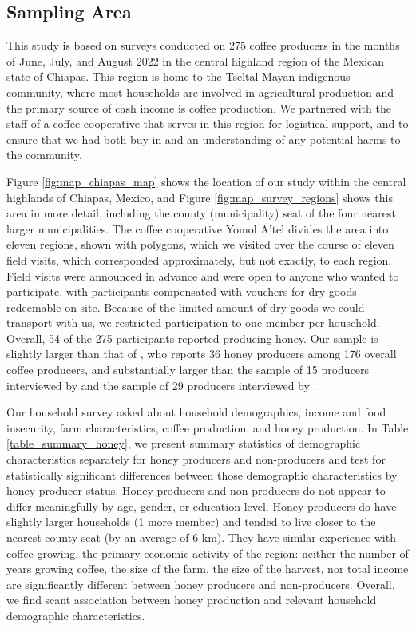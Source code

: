 \documentclass[../main.tex]{subfiles}
\begin{document}
\subsection{Sampling Area}
This study is based on surveys conducted on 275 coffee producers in the months of June,
July, and August 2022 in the central highland region of the Mexican state of Chiapas.
This region is home to the Tseltal Mayan indigenous community, 
where most households are involved in agricultural production and 
the primary source of cash income is coffee production. 
We partnered with the staff of a coffee cooperative 
that serves in this region for logistical support, and to ensure that we had both buy-in and an understanding of any potential harms to the community.

Figure \ref{fig:map_chiapas_map} shows the location of our study within the central highlands of Chiapas, Mexico, and Figure \ref{fig:map_survey_regions} shows this area in more detail, including the county (municipality) seat of the four nearest larger municipalities. The coffee cooperative Yomol A'tel divides the area into eleven regions, shown with polygons, which we visited over the course of eleven field visits, which corresponded approximately, but not exactly, to each region.  Field visits were announced in advance and were open to anyone who wanted to participate, with  participants compensated with vouchers for dry goods redeemable on-site. Because of the limited amount of dry goods we could transport with us, we restricted participation to one member per household. Overall, 54 of the 275 participants reported producing honey. 
Our sample is slightly larger than that of \textcite{anderzenEffectsOnfarmDiversification2020}, who reports 36 honey producers among 176 overall coffee producers, and substantially larger than the sample of 15 producers interviewed by \textcite{gerliczUsePerceptionsAlternative2019} and the sample of 29 producers interviewed by \textcite{morrisMesesFlacosSeasonal2013}.

Our household survey asked about household demographics, 
income and food insecurity, farm characteristics, 
coffee production, and honey production. 
In Table \ref{table_summary_honey},
we present summary statistics of demographic 
characteristics separately for 
honey producers and non-producers and test for statistically
significant differences between those
demographic characteristics by honey producer status. Honey producers and non-producers do not appear to differ meaningfully
by age, gender, or education level. Honey producers do have slightly larger households (1 more member) and tended to live closer to the nearest county seat (by an average of 6 km).
They have similar experience with coffee growing, the primary
economic activity of the region: neither the number of years
growing coffee, the size of the farm, the size of the 
harvest, nor total income are significantly different between honey producers and non-producers. Overall, we find scant association between honey production and relevant household demographic characteristics. 
\end{document}
